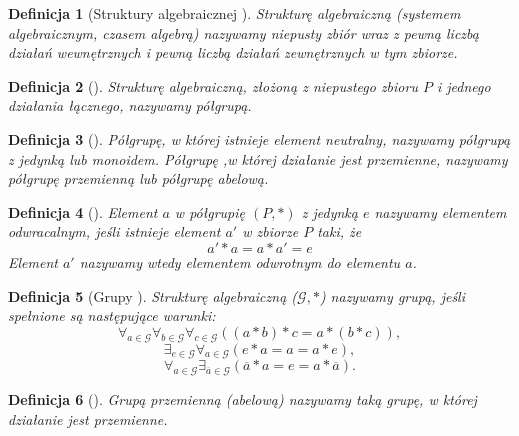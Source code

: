 \documentclass[12pt,a4paper]{report}
\newtheorem{definition}{Definicja}
\begin{document}
\begin{definition}[Struktury algebraicznej \citep{jedrzejewski2011algebra}]
Strukturę algebraiczną (systemem algebraicznym, czasem algebrą) nazywamy niepusty zbiór wraz z pewną liczbą działań wewnętrznych i pewną liczbą działań zewnętrznych w tym zbiorze.
\end{definition}
\begin{definition}[\citep{jedrzejewski2011algebra}]
Strukturę algebraiczną, złożoną z niepustego zbioru $P$ i jednego działania łącznego, nazywamy półgrupą.
\end{definition}
\begin{definition}[\citep{jedrzejewski2011algebra}]
Półgrupę, w której istnieje element neutralny, nazywamy półgrupą z jedynką lub monoidem. Półgrupę ,w której działanie jest przemienne, nazywamy półgrupę przemienną lub półgrupę abelową. 
\end{definition}
\begin{definition}[\citep{jedrzejewski2011algebra}]
Element $a$ w półgrupię $(P,\ast)$ z jedynką $e$ nazywamy elementem odwracalnym, jeśli istnieje element $a'$ w zbiorze $P$ taki, że
\begin{equation*}
a'\ast a=a\ast a'=e
\end{equation*}
Element $a'$ nazywamy wtedy elementem odwrotnym do elementu $a$.
\end{definition}
\begin{definition}[Grupy \citep{jedrzejewski2011algebra}]
Strukturę algebraiczną ($\mathcal{G},\ast$) nazywamy grupą, jeśli spełnione są następujące warunki:
\begin{equation*}
\forall_{a\in \mathcal{G}} \forall_{b\in \mathcal{G}} \forall_{c\in \mathcal{G}} ((a\ast b)\ast c=a\ast (b\ast c)),
\end{equation*}
\begin{equation*}
\exists_{e\in \mathcal{G}} \forall_{a\in \mathcal{G}}(e\ast a=a=a\ast e),
\end{equation*}
\begin{equation*}
\forall_{a \in \mathcal{G}} \exists_{\overline{a}\in\mathcal{G}}(\overline{a}\ast a=e=a\ast \overline{a}).
\end{equation*}
\end{definition}
\begin{definition}[\citep{jedrzejewski2011algebra}]
Grupą przemienną (abelową) nazywamy taką grupę, w której działanie jest przemienne.
\end{definition}
\end{document}
